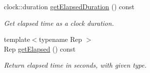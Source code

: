 \begin{Indent}
\begin{DoxyCompactItemize}
\mbox{\label{classrev_1_1_timer_a359171f507dec770263e90cb91887493}} 
clock\+::duration \mbox{\hyperlink{classrev_1_1_timer_a359171f507dec770263e90cb91887493}{get\+Elapsed\+Duration}} () const
\begin{DoxyCompactList}\small\item\em Get elapsed time as a clock duration. \end{DoxyCompactList}\item 
\mbox{\label{classrev_1_1_timer_a4ce2329776d638ba16f9010490182e36}} 
{\footnotesize template$<$typename Rep $>$ }\\Rep \mbox{\hyperlink{classrev_1_1_timer_a4ce2329776d638ba16f9010490182e36}{get\+Elapsed}} () const
\begin{DoxyCompactList}\small\item\em Return elapsed time in seconds, with given type. \end{DoxyCompactList}\end{DoxyCompactItemize}
\end{Indent}
